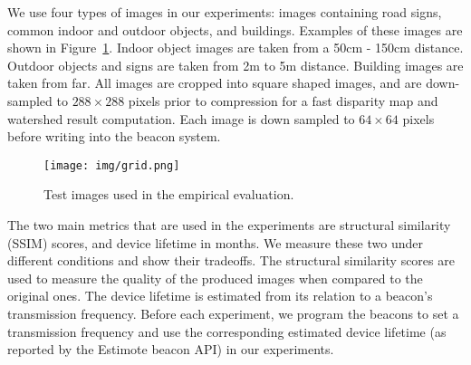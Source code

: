 

We use four types of images in our experiments: images containing road signs, common indoor and outdoor objects, and buildings. Examples of these images are shown in Figure~\ref{fig:testimages}. Indoor object images are taken from a 50cm - 150cm distance. Outdoor objects and signs are taken from 2m to 5m distance. Building images are taken from far. All images are cropped into square shaped images, and are down-sampled to $288\times288$ pixels prior to compression for a fast disparity map and watershed result computation. Each image is down sampled to $64\times64$ pixels before writing into the beacon system.

\begin{figure}[!htb]
	\begin{center}
		\texttt{[image: img/grid.png]}
		\caption{Test images used in the empirical evaluation.}
		\label{fig:testimages}
	\end{center}
	\vspace{-1.5em}
\end{figure}

The two main metrics that are used in the experiments are structural similarity (SSIM) scores, and device lifetime in months. We measure these two under different conditions and show their tradeoffs. The structural similarity scores are used to measure the quality of the produced images when compared to the original ones. The device lifetime is estimated from its relation to a beacon's transmission frequency. Before each experiment, we program the beacons to set a transmission frequency and use the corresponding estimated device lifetime (as reported by the Estimote beacon API) in our experiments.

